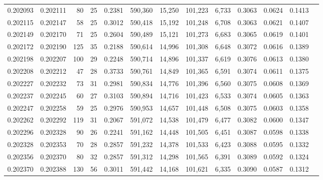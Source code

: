 \begin{tabular}{rrrrrrrrrrrrr}
0.202093 & 0.202111 &    80 &  25 &                                     0.2381 & 590,360 &  15,250 & 101,223 &   6,733 & 0.3063 & 0.0624 & 0.1413 \\
0.202115 & 0.202147 &    58 &  25 &                                     0.3012 & 590,418 &  15,192 & 101,248 &   6,708 & 0.3063 & 0.0621 & 0.1407 \\
0.202149 & 0.202170 &    71 &  25 &                                     0.2604 & 590,489 &  15,121 & 101,273 &   6,683 & 0.3065 & 0.0619 & 0.1401 \\
0.202172 & 0.202190 &   125 &  35 &                                     0.2188 & 590,614 &  14,996 & 101,308 &   6,648 & 0.3072 & 0.0616 & 0.1389 \\
0.202198 & 0.202207 &   100 &  29 &                                     0.2248 & 590,714 &  14,896 & 101,337 &   6,619 & 0.3076 & 0.0613 & 0.1380 \\
0.202208 & 0.202212 &    47 &  28 &                                     0.3733 & 590,761 &  14,849 & 101,365 &   6,591 & 0.3074 & 0.0611 & 0.1375 \\
0.202227 & 0.202232 &    73 &  31 &                                     0.2981 & 590,834 &  14,776 & 101,396 &   6,560 & 0.3075 & 0.0608 & 0.1369 \\
0.202237 & 0.202245 &    60 &  27 &                                     0.3103 & 590,894 &  14,716 & 101,423 &   6,533 & 0.3074 & 0.0605 & 0.1363 \\
0.202247 & 0.202258 &    59 &  25 &                                     0.2976 & 590,953 &  14,657 & 101,448 &   6,508 & 0.3075 & 0.0603 & 0.1358 \\
0.202262 & 0.202292 &   119 &  31 &                                     0.2067 & 591,072 &  14,538 & 101,479 &   6,477 & 0.3082 & 0.0600 & 0.1347 \\
0.202296 & 0.202328 &    90 &  26 &                                     0.2241 & 591,162 &  14,448 & 101,505 &   6,451 & 0.3087 & 0.0598 & 0.1338 \\
0.202328 & 0.202353 &    70 &  28 &                                     0.2857 & 591,232 &  14,378 & 101,533 &   6,423 & 0.3088 & 0.0595 & 0.1332 \\
0.202356 & 0.202370 &    80 &  32 &                                     0.2857 & 591,312 &  14,298 & 101,565 &   6,391 & 0.3089 & 0.0592 & 0.1324 \\
0.202370 & 0.202388 &   130 &  56 &                                     0.3011 & 591,442 &  14,168 & 101,621 &   6,335 & 0.3090 & 0.0587 & 0.1312 \\

\end{tabular}
